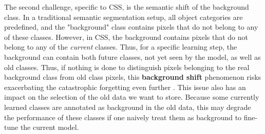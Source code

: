 The second challenge, specific to \ac{CSS}, is the semantic shift of the background class. In a
traditional semantic segmentation setup, all object categories are predefined, and the "background"
class contains pixels that do not belong to any of these classes. However, in \ac{CSS}, the background
contains pixels that do not belong to any of the \textit{current} classes. Thus, for a specific
learning step, the background can contain both future classes, not yet seen by the model, as well as
old classes. Thus, if nothing is done to distinguish pixels belonging to the real background class
from old class pixels, this \textbf{background shift} phenomenon risks exacerbating the catastrophic
forgetting even further \cite{cermelli2020modelingthebackground}. This issue also has an impact on
the selection of the old data we want to store. Because some currently learned classes are annotated
as background in the old data, this may degrade the performance of these classes if one naively
treat them as background to fine-tune the current model.

